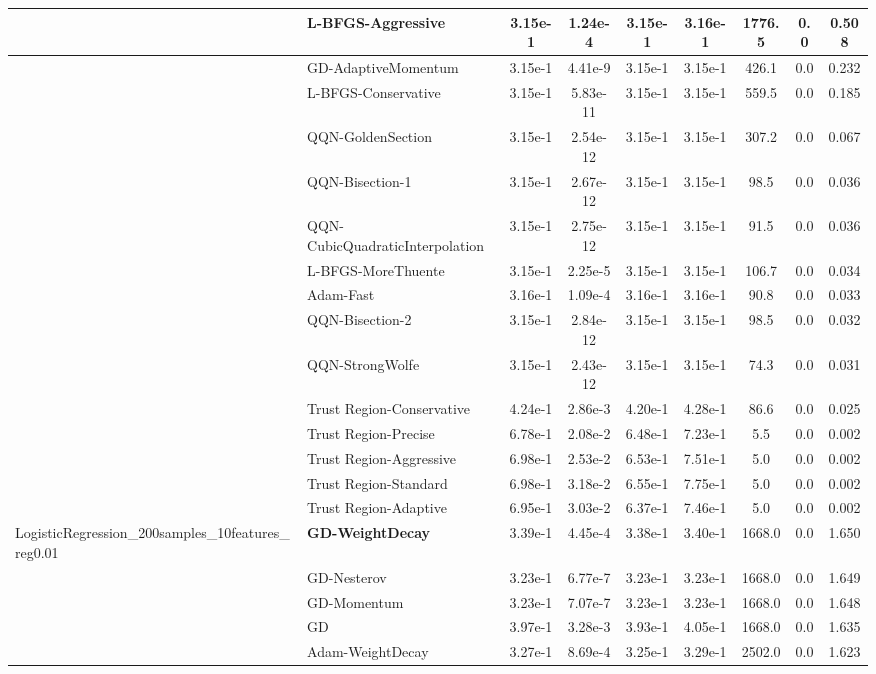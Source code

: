 \documentclass[10pt]{article}
\begin{document}
\begin{longtable}{|l|l|c|c|c|c|c|c|c|}
\hline
 & L-BFGS-Aggressive & 3.15e-1 & 1.24e-4 & 3.15e-1 & 3.16e-1 & 1776.5 & 0.0 & 0.508 \\
\hline
 & GD-AdaptiveMomentum & 3.15e-1 & 4.41e-9 & 3.15e-1 & 3.15e-1 & 426.1 & 0.0 & 0.232 \\
\hline
 & L-BFGS-Conservative & 3.15e-1 & 5.83e-11 & 3.15e-1 & 3.15e-1 & 559.5 & 0.0 & 0.185 \\
\hline
 & QQN-GoldenSection & 3.15e-1 & 2.54e-12 & 3.15e-1 & 3.15e-1 & 307.2 & 0.0 & 0.067 \\
\hline
 & QQN-Bisection-1 & 3.15e-1 & 2.67e-12 & 3.15e-1 & 3.15e-1 & 98.5 & 0.0 & 0.036 \\
\hline
 & QQN-CubicQuadraticInterpolation & 3.15e-1 & 2.75e-12 & 3.15e-1 & 3.15e-1 & 91.5 & 0.0 & 0.036 \\
\hline
 & L-BFGS-MoreThuente & 3.15e-1 & 2.25e-5 & 3.15e-1 & 3.15e-1 & 106.7 & 0.0 & 0.034 \\
\hline
 & Adam-Fast & 3.16e-1 & 1.09e-4 & 3.16e-1 & 3.16e-1 & 90.8 & 0.0 & 0.033 \\
\hline
 & QQN-Bisection-2 & 3.15e-1 & 2.84e-12 & 3.15e-1 & 3.15e-1 & 98.5 & 0.0 & 0.032 \\
\hline
 & QQN-StrongWolfe & 3.15e-1 & 2.43e-12 & 3.15e-1 & 3.15e-1 & 74.3 & 0.0 & 0.031 \\
\hline
 & Trust Region-Conservative & 4.24e-1 & 2.86e-3 & 4.20e-1 & 4.28e-1 & 86.6 & 0.0 & 0.025 \\
\hline
 & Trust Region-Precise & 6.78e-1 & 2.08e-2 & 6.48e-1 & 7.23e-1 & 5.5 & 0.0 & 0.002 \\
\hline
 & Trust Region-Aggressive & 6.98e-1 & 2.53e-2 & 6.53e-1 & 7.51e-1 & 5.0 & 0.0 & 0.002 \\
\hline
 & Trust Region-Standard & 6.98e-1 & 3.18e-2 & 6.55e-1 & 7.75e-1 & 5.0 & 0.0 & 0.002 \\
\hline
 & Trust Region-Adaptive & 6.95e-1 & 3.03e-2 & 6.37e-1 & 7.46e-1 & 5.0 & 0.0 & 0.002 \\
LogisticRegression\_200samples\_10features\_reg0.01 & \textbf{GD-WeightDecay} & 3.39e-1 & 4.45e-4 & 3.38e-1 & 3.40e-1 & 1668.0 & 0.0 & 1.650 \\
\hline
 & GD-Nesterov & 3.23e-1 & 6.77e-7 & 3.23e-1 & 3.23e-1 & 1668.0 & 0.0 & 1.649 \\
\hline
 & GD-Momentum & 3.23e-1 & 7.07e-7 & 3.23e-1 & 3.23e-1 & 1668.0 & 0.0 & 1.648 \\
\hline
 & GD & 3.97e-1 & 3.28e-3 & 3.93e-1 & 4.05e-1 & 1668.0 & 0.0 & 1.635 \\
\hline
 & Adam-WeightDecay & 3.27e-1 & 8.69e-4 & 3.25e-1 & 3.29e-1 & 2502.0 & 0.0 & 1.623 \\

\end{longtable}
\end{document}
